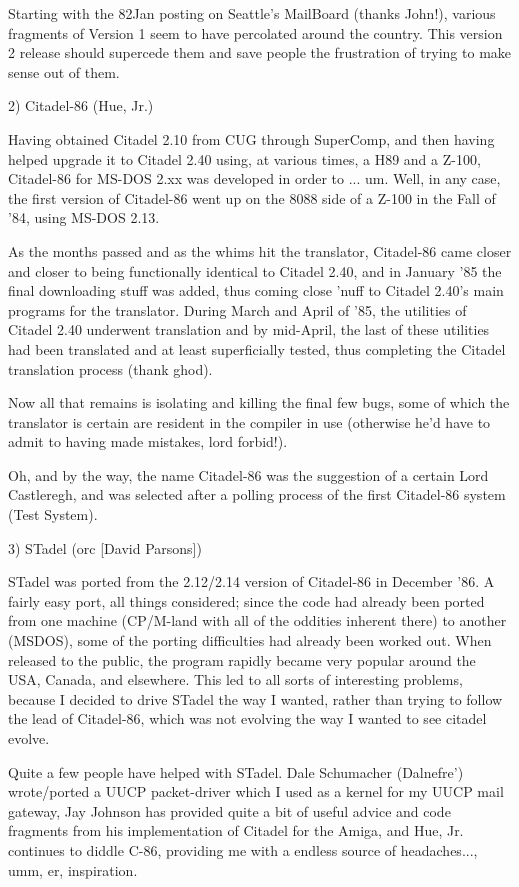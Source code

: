 Starting with the 82Jan posting on Seattle's MailBoard (thanks
John!), various fragments of Version 1 seem to have percolated
around the country.  This version 2 release should supercede them
and save people the frustration of trying to make sense out of
them.  

2) Citadel-86 (Hue, Jr.)

Having obtained Citadel 2.10 from CUG through SuperComp, and then 
having helped upgrade it to Citadel 2.40 using, at various times,
a H89 and a Z-100, Citadel-86 for MS-DOS 2.xx was developed in
order to ...  um.  Well, in any case, the first version of
Citadel-86 went up on the 8088 side of a Z-100 in the Fall of '84,
using MS-DOS 2.13.  

As the months passed and as the whims hit the translator,
Citadel-86 came closer and closer to being functionally identical
to Citadel 2.40, and in January '85 the final downloading stuff
was added, thus coming close 'nuff to Citadel 2.40's main programs
for the translator.  During March and April of '85, the utilities
of Citadel 2.40 underwent translation and by mid-April, the last
of these utilities had been translated and at least superficially
tested, thus completing the Citadel translation process (thank
ghod).  

Now all that remains is isolating and killing the final few bugs, 
some of which the translator is certain are resident in the
compiler in use (otherwise he'd have to admit to having made
mistakes, lord forbid!).  

Oh, and by the way, the name Citadel-86 was the suggestion of a 
certain Lord Castleregh, and was selected after a polling process
of the first Citadel-86 system (Test System).  

3) STadel (orc [David Parsons])

STadel was ported from the 2.12/2.14 version of Citadel-86 in 
December '86.  A fairly easy port, all things considered;  since
the code had already been ported from one machine (CP/M-land with
all of the oddities inherent there) to another (MSDOS), some of
the porting difficulties had already been worked out.  When
released to the public, the program rapidly became very popular
around the USA, Canada, and elsewhere.  This led to all sorts of
interesting problems, because I decided to drive STadel the way I
wanted, rather than trying to follow the lead of Citadel-86, which
was not evolving the way I wanted to see citadel evolve.  

Quite a few people have helped with STadel.  Dale Schumacher 
(Dalnefre') wrote/ported a UUCP packet-driver which I used as a 
kernel for my UUCP mail gateway, Jay Johnson has provided quite a
bit of useful advice and code fragments from his implementation 
of Citadel for the Amiga, and Hue, Jr.  continues to diddle C-86, 
providing me with a endless source of headaches..., umm, er, 
inspiration.  


